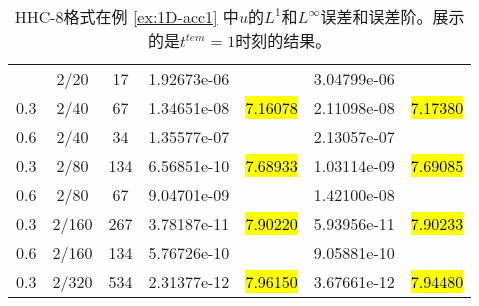 \begin{table}[htbp]
	\caption{HHC-8格式在例 \ref{ex:1D-acc1} 中$u$的$L^1$和$L^\infty$误差和误差阶。展示的是$t^{tem} = 1$时刻的结果。}
	\label{ta:1D-ex1-HHC8}
	\centering
	\begin{tabular}{ccccccc}
		\toprule
		\titleintable
		\midrule
		0.6 & 2/20  & 17  & 1.92673e-06 &              & 3.04799e-06 &              \\
		0.3 & 2/40  & 67  & 1.34651e-08 & \hl{7.16078} & 2.11098e-08 & \hl{7.17380} \\
		\midrule
		0.6 & 2/40  & 34  & 1.35577e-07 &              & 2.13057e-07 &              \\
		0.3 & 2/80  & 134 & 6.56851e-10 & \hl{7.68933} & 1.03114e-09 & \hl{7.69085} \\
		\midrule
		0.6 & 2/80  & 67  & 9.04701e-09 &              & 1.42100e-08 &              \\
		0.3 & 2/160 & 267 & 3.78187e-11 & \hl{7.90220} & 5.93956e-11 & \hl{7.90233} \\
		\midrule
		0.6 & 2/160 & 134 & 5.76726e-10 &              & 9.05881e-10 &              \\
		0.3 & 2/320 & 534 & 2.31377e-12 & \hl{7.96150} & 3.67661e-12 & \hl{7.94480} \\
		\bottomrule
	\end{tabular}
\end{table}
\undef\titleintable